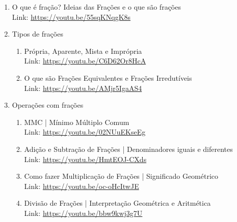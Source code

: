  
	\begin{enumerate}
		\item O que é fração? 
		Ideias das Frações e o que são frações \\[-0.5cm]
  
		{\color{red} \;\Large {}} \;Link: \url{https://youtu.be/55sqKNqgK8s}
		\item Tipos de frações
		\begin{enumerate}
			\item Própria, Aparente, Mista e Imprópria \\[-0.5cm]
   
		      {\color{red} \;\Large {}} Link: \url{https://youtu.be/C6D62Or8HcA}
			\item O que são Frações Equivalentes e Frações Irredutíveis \\[-0.5cm]
   
		      {\color{red} \;\Large {}} Link: \url{https://youtu.be/AMjr5IgaAS4}
		\end{enumerate}
		\item Operações com frações
		\begin{enumerate}
			\item MMC | Mínimo Múltiplo Comum \\[-0.5cm]
   
			{\color{red} \;\Large {}} Link: \url{https://youtu.be/02NUuEKseEg}
			\item Adição e Subtração de Frações | Denominadores iguais e diferentes \\[-0.5cm]
   
			{\color{red} \;\Large {}} Link: \url{https://youtu.be/HmtEOJ-CXds} 
			\item Como fazer Multiplicação de Frações | Significado Geométrico \\[-0.5cm]
   
			{\color{red} \;\Large {}} Link: \url{https://youtu.be/oc-oHcItwJE}
			\item Divisão de Frações | Interpretação Geométrica e Aritmética \\[-0.5cm]
   
			{\color{red} \;\Large {}} Link: \url{https://youtu.be/bbw9kwj3g7U}
		\end{enumerate}
	\end{enumerate}